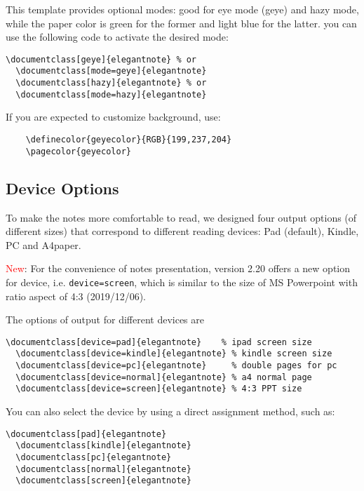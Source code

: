 \documentclass[en,hazy,screen,blue,14pt]{elegantnote}
\begin{document}
This template provides optional modes: good for eye mode (geye) and hazy mode, while the paper color is green for the former and light blue for the latter. you can use the following code to activate the desired mode:
\begin{lstlisting}[frame=none]  
  \documentclass[geye]{elegantnote} % or
  \documentclass[mode=geye]{elegantnote}
  \documentclass[hazy]{elegantnote} % or
  \documentclass[mode=hazy]{elegantnote}
\end{lstlisting}

\begin{remark}
  If you are expected to customize background, use:
  \begin{lstlisting}
    \definecolor{geyecolor}{RGB}{199,237,204}
    \pagecolor{geyecolor}
  \end{lstlisting}
\end{remark}


\subsection{Device Options}

To make the notes more comfortable to read, we designed four output options (of different sizes) that correspond to different reading devices: Pad (default), Kindle, PC and A4paper. 

\textcolor{red}{New}: For the convenience of notes presentation, version 2.20 offers a new option for device, i.e. \lstinline{device=screen}, which is similar to the size of MS Powerpoint with ratio aspect of 4:3 (2019/12/06).

The options of output for different devices are
\begin{lstlisting}[frame=none]  
  \documentclass[device=pad]{elegantnote}    % ipad screen size
  \documentclass[device=kindle]{elegantnote} % kindle screen size
  \documentclass[device=pc]{elegantnote}     % double pages for pc 
  \documentclass[device=normal]{elegantnote} % a4 normal page
  \documentclass[device=screen]{elegantnote} % 4:3 PPT size
\end{lstlisting}

\begin{note}
You can also select the device by using a direct assignment method, such as:
\end{note}

\begin{lstlisting}[frame=none]  
  \documentclass[pad]{elegantnote}
  \documentclass[kindle]{elegantnote}
  \documentclass[pc]{elegantnote}
  \documentclass[normal]{elegantnote}
  \documentclass[screen]{elegantnote}
\end{lstlisting}
\end{document}
